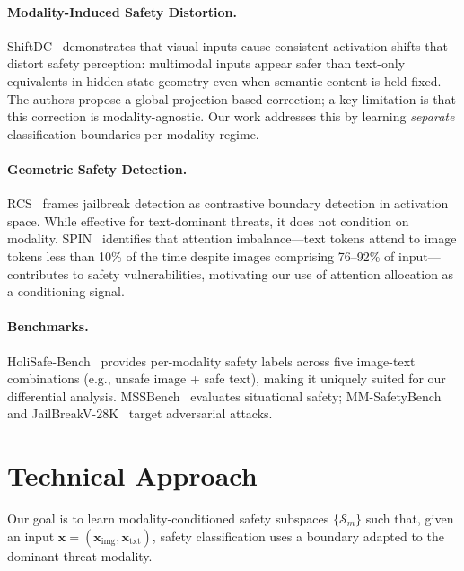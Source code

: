 \documentclass{article}
\begin{document}
\paragraph{Modality-Induced Safety Distortion.}
ShiftDC~\cite{zou2025shiftdc} demonstrates that visual inputs cause consistent activation shifts
that distort safety perception: multimodal inputs appear safer than text-only equivalents in
hidden-state geometry even when semantic content is held fixed. The authors propose a global
projection-based correction; a key limitation is that this correction is modality-agnostic. Our
work addresses this by learning \emph{separate} classification boundaries per modality regime.

\paragraph{Geometric Safety Detection.}
RCS~\cite{liu2025rcs} frames jailbreak detection as contrastive boundary detection in activation
space. While effective for text-dominant threats, it does not condition on modality. SPIN~\cite
{chen2025spin} identifies that attention imbalance---text tokens attend to image tokens less than
10\% of the time despite images comprising 76--92\% of input---contributes to safety
vulnerabilities, motivating our use of attention allocation as a conditioning signal.

\paragraph{Benchmarks.}
HoliSafe-Bench~\cite{lee2025holisafe} provides per-modality safety labels across five image-text
combinations (e.g., unsafe image + safe text), making it uniquely suited for our differential
analysis. MSSBench~\cite{zhou2024mss} evaluates situational safety; MM-SafetyBench~\cite
{liu2024mmsafetybench} and JailBreakV-28K~\cite{luo2024jailbreakv} target adversarial attacks.

\section{Technical Approach}

Our goal is to learn modality-conditioned safety subspaces $\{\mathcal{S}_m\}$ such that, given an
input $\mathbf{x} = (\mathbf{x}_\text{img}, \mathbf{x}_\text{txt})$, safety classification uses a
boundary adapted to the dominant threat modality.
\end{document}
